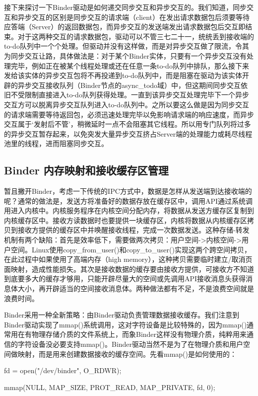 \documentclass[a4paper,11pt]{article}
\begin{document}
接下来探讨一下Binder驱动是如何递交同步交互和异步交互的。我们知道，同步交互和异步交互的区别是同步交互的请求端（client）在发出请求数据包后须要等待应答端（Server）的返回数据包，而异步交互的发送端发出请求数据包后交互即结束。对于这两种交互的请求数据包，驱动可以不管三七二十一，统统丢到接收端的to-do队列中一个个处理。但驱动并没有这样做，而是对异步交互做了限流，令其为同步交互让路，具体做法是：对于某个Binder实体，只要有一个异步交互没有处理完毕，例如正在被某个线程处理或还在任意一条to-do队列中排队，那么接下来发给该实体的异步交互包将不再投递到to-do队列中，而是阻塞在驱动为该实体开辟的异步交互接收队列（Binder节点的async_todo域）中，但这期间同步交互依旧不受限制直接进入to-do队列获得处理。一直到该异步交互处理完毕下一个异步交互方可以脱离异步交互队列进入to-do队列中。之所以要这么做是因为同步交互的请求端需要等待返回包，必须迅速处理完毕以免影响请求端的响应速度，而异步交互属于‘发射后不管’，稍微延时一点不会阻塞其它线程。所以用专门队列将过多的异步交互暂存起来，以免突发大量异步交互挤占Server端的处理能力或耗尽线程池里的线程，进而阻塞同步交互。


\subsection{ Binder 内存映射和接收缓存区管理}
暂且撇开Binder，考虑一下传统的IPC方式中，数据是怎样从发送端到达接收端的呢？通常的做法是，发送方将准备好的数据存放在缓存区中，调用API通过系统调用进入内核中。内核服务程序在内核空间分配内存，将数据从发送方缓存区复制到内核缓存区中。接收方读数据时也要提供一块缓存区，内核将数据从内核缓存区拷贝到接收方提供的缓存区中并唤醒接收线程，完成一次数据发送。这种存储-转发机制有两个缺陷：首先是效率低下，需要做两次拷贝：用户空间->内核空间->用户空间。Linux使用copy_from_user()和copy_to_user()实现这两个跨空间拷贝，在此过程中如果使用了高端内存（high memory），这种拷贝需要临时建立/取消页面映射，造成性能损失。其次是接收数据的缓存要由接收方提供，可接收方不知道到底要多大的缓存才够用，只能开辟尽量大的空间或先调用API接收消息头获得消息体大小，再开辟适当的空间接收消息体。两种做法都有不足，不是浪费空间就是浪费时间。

Binder采用一种全新策略：由Binder驱动负责管理数据接收缓存。我们注意到Binder驱动实现了mmap()系统调用，这对字符设备是比较特殊的，因为mmap()通常用在有物理存储介质的文件系统上，而象Binder这样没有物理介质，纯粹用来通信的字符设备没必要支持mmap()。Binder驱动当然不是为了在物理介质和用户空间做映射，而是用来创建数据接收的缓存空间。先看mmap()是如何使用的：

fd = open("/dev/binder", O_RDWR);

mmap(NULL, MAP_SIZE, PROT_READ, MAP_PRIVATE, fd, 0);
\end{document}
